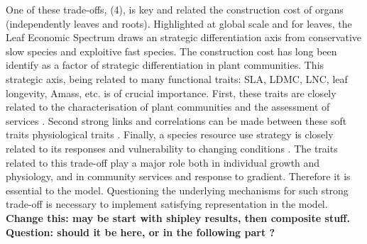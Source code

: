 One of these trade-offs, (4), is key and related the construction cost of organs (independently leaves and roots). Highlighted at global scale and for leaves, the Leaf Economic Spectrum \cite{wright_worldwide_2004} draws an strategic differentiation axis from conservative slow species and exploitive fast species. The construction cost has long been identify as a factor of strategic differentiation in plant communities\cite{westoby_leaf-height-seed_1998}. This strategic axis, being related to many functional traits: SLA, LDMC, LNC, leaf longevity, Amass, etc.\cite{wright_worldwide_2004} is of crucial importance. First, these traits are closely related to the characterisation of plant communities and the assessment of services \cite{grime_benefits_1998}. Second strong links and correlations can be made between these soft traits physiological traits \cite{craine_functional_2002, reich_variation_2003, wright_worlwide_2004}. Finally, a species resource use strategy is closely related to its responses and vulnerability to changing conditions \cite{poorter_causes_2009, dwyer_specific_2014, deleglise_drought-induced_2015}. The traits related to this trade-off play a major role both in individual growth and physiology, and in community services and response to gradient. Therefore it is essential to the model. Questioning the underlying mechanisms for such strong trade-off is necessary to implement satisfying representation in the model.\\

\textbf{Change this: may be start with shipley results, then composite stuff. Question: should it be here, or in the following part ?}

